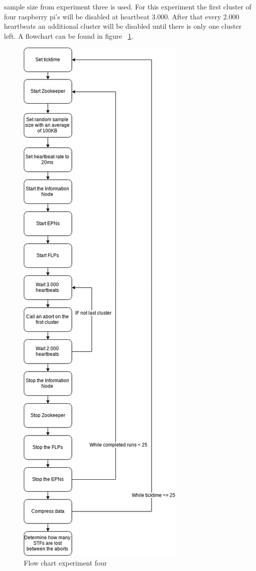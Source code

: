  sample size from experiment three is used. For this experiment the first cluster of four raspberry pi's will be disabled at heartbeat 3.000. After that every 2.000 heartbeats an additional cluster will be disabled until there is only one cluster left. A flowchart can be found in figure ~\ref{fig:FlowChart4}.

\begin{figure}[htb]
	\centering
	\includegraphics[width=\textwidth,height=\textheight,keepaspectratio]{./graphics/ex4.png}
	\caption{Flow chart experiment four}
	\label{fig:FlowChart4}
\end{figure}

